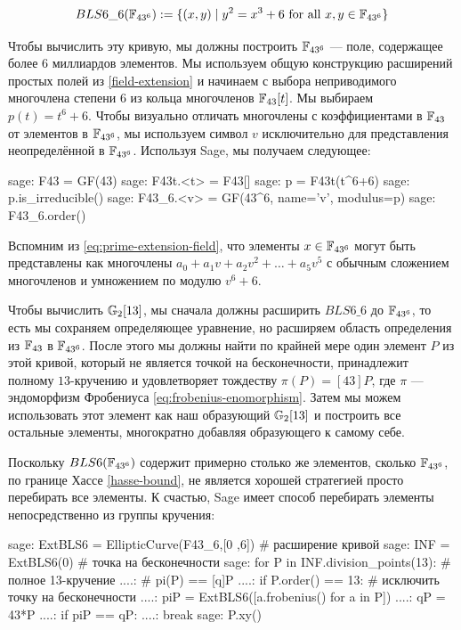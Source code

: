 \begin{equation}
\label{def:extended-bls6}
BLS6\_6(\mathbb{F}_{43^6}) := \{(x,y)\;|\; y^2 = x^3 + 6 \text{ for all } x,y \in \mathbb{F}_{43^6}\}
\end{equation}

Чтобы вычислить эту кривую, мы должны построить $\mathbb{F}_{43^6}$ — поле, содержащее более 6 миллиардов элементов. Мы используем общую конструкцию расширений простых полей из \ref{field-extension} и начинаем с выбора неприводимого многочлена степени $6$ из кольца многочленов $\mathbb{F}_{43}[t]$. Мы выбираем $p(t) = t^6+6$. Чтобы визуально отличать многочлены с коэффициентами в $\mathbb{F}_{43}$ от элементов в $\mathbb{F}_{43^6}$, мы используем символ $v$ исключительно для представления неопределённой в $\mathbb{F}_{43^6}$. Используя Sage, мы получаем следующее:
\begin{sagecommandline}
sage: F43 = GF(43)
sage: F43t.<t> = F43[]
sage: p = F43t(t^6+6)
sage: p.is_irreducible()
sage: F43_6.<v> = GF(43^6, name='v', modulus=p)
sage: F43_6.order()
\end{sagecommandline}

Вспомним из \ref{eq:prime-extension-field}, что элементы $x\in\mathbb{F}_{43^6}$ могут быть представлены как многочлены $a_0+a_1v + a_2v^2+\ldots + a_5 v^5$ с обычным сложением многочленов и умножением по модулю $v^6+6$. 

Чтобы вычислить $\mathbb{G}_2[13]$, мы сначала должны расширить $BLS6\_6$ до $\mathbb{F}_{43^6}$, то есть мы сохраняем определяющее уравнение, но расширяем область определения из $\mathbb{F}_{43}$ в $\mathbb{F}_{43^6}$. После этого мы должны найти по крайней мере один элемент $P$ из этой кривой, который не является точкой на бесконечности, принадлежит полному $13$-кручению и удовлетворяет тождеству $\pi(P) = [43]P$, где $\pi$ — эндоморфизм Фробениуса \ref{eq:frobenius-enomorphism}. Затем мы можем использовать этот элемент как наш образующий $\mathbb{G}_2[13]$ и построить все остальные элементы, многократно добавляя образующего к самому себе.

Поскольку $BLS6(\mathbb{F}_{43^6})$ содержит примерно столько же элементов, сколько $\mathbb{F}_{43^6}$, по границе Хассе \ref{hasse-bound}, не является хорошей стратегией просто перебирать все элементы. К счастью, Sage имеет способ перебирать элементы непосредственно из группы кручения:

\begin{sagecommandline}
sage: ExtBLS6 = EllipticCurve(F43_6,[0 ,6]) # расширение кривой
sage: INF = ExtBLS6(0) # точка на бесконечности
sage: for P in INF.division_points(13): # полное 13-кручение
....:     # pi(P) == [q]P
....:     if P.order() == 13: # исключить точку на бесконечности
....:         piP = ExtBLS6([a.frobenius() for a in P])
....:         qP = 43*P
....:         if piP == qP:
....:             break
sage: P.xy()
\end{sagecommandline}

